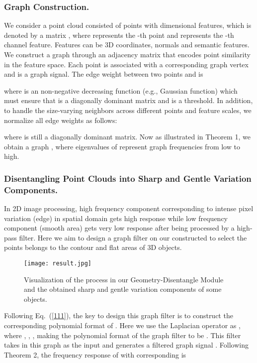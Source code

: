 \documentclass[letterpaper]{article} \usepackage{aaai21}  \usepackage{times}  \usepackage{helvet} \usepackage{courier}  \usepackage[hyphens]{url}  \usepackage{graphicx} \urlstyle{rm} \def\UrlFont{\rm}  \usepackage{natbib}  \usepackage{caption} \frenchspacing  \setlength{\pdfpagewidth}{8.5in}  \setlength{\pdfpageheight}{11in}  \usepackage{color}
\begin{document}
\subsubsection{Graph Construction.}

We consider a point cloud consisted of  points with dimensional features, which is denoted by a matrix , where  represents the -th point and  represents the -th channel feature. Features can be 3D coordinates, normals and semantic features. We construct a graph  through an adjacency matrix  that encodes point similarity in the feature space. Each point  is associated with a corresponding graph vertex  and   is a graph signal. The edge weight between two points  and  is

where  is an non-negative decreasing function (e.g., Gaussian function) which must ensure that  is a diagonally dominant matrix and  is a threshold. In addition, to handle the size-varying neighbors across
different points and feature scales, we normalize all edge weights as follows:

where  is still a diagonally dominant matrix. Now as illustrated in Theorem 1, we obtain a graph  , where
eigenvalues of    represent graph frequencies from low to high.



\subsubsection{Disentangling Point Clouds into Sharp and Gentle Variation Components.}
In 2D image processing, high frequency component corresponding to intense pixel variation (edge) in spatial domain gets high response while low frequency component (smooth area) gets very low response after being processed by a high-pass filter. Here we aim to design a graph filter on our constructed  to select the points belongs to the contour and flat areas of 3D objects. 
\begin{figure}[ht]
\setlength{\abovecaptionskip}{0cm} 
	\begin{center}
	\texttt{[image: result.jpg]} \end{center}
	\setlength{\belowcaptionskip}{0cm} 
	\caption{Visualization of the process in our Geometry-Disentangle Module and the obtained sharp and gentle variation components of some objects.}
	\label{selection}
\end{figure}
Following Eq.~(\ref{111}), the key to design this graph filter is to construct the corresponding polynomial format of .
Here we use the Laplacian operator as \cite{fast}, where , , , making the polynomial format of the graph filter to be . This filter takes  in this graph as the input and generates a filtered graph signal . Following Theorem 2, the frequency response of  with corresponding  is
 
\end{document}
